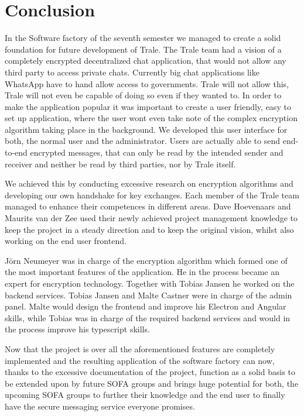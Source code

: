 \chapter{Conclusion}

In the Software factory of the seventh semester we managed to create a solid foundation for future development of Trale. 
The Trale team had a vision of a completely encrypted decentralized chat application, that would not allow any third party to access private chats. Currently big chat applications like WhatsApp have to hand allow access to governments. Trale will not allow this, Trale will not even be capable of doing so even if they wanted to. In order to make the application popular it was important to create a user friendly, easy to set up application, where the user wont even take note of the complex encryption algorithm taking place in the background. 
We developed this user interface for both, the normal user and the administrator. Users are actually able to send end-to-end encrypted messages, that can only be read by the intended sender and receiver and neither be read by third parties, nor by Trale itself. 

We achieved this by conducting excessive research on encryption algorithms and developing our own handshake for key exchanges. Each member of the Trale team managed to enhance their competences in different areas. Dave Hoevenaars and Maurits van der Zee used their newly achieved project management knowledge to keep the project in a steady direction and to keep the original vision, whilst also working on the end user frontend.
 
Jörn Neumeyer was in charge of the encryption algorithm which formed one of the most important features of the application. He in the process became an expert for encryption technology. Together with Tobias Jansen he worked on the backend services. Tobias Jansen and Malte Castner were in charge of the admin panel. Malte would design the frontend and improve his Electron and Angular skills, while Tobias was in charge of the required backend services and would in the process improve his typescript skills. 

Now that the project is over all the aforementioned features are completely implemented and the resulting application of the software factory can now, thanks to the excessive documentation of the project, function as a solid basis to be extended upon by future SOFA groups and brings huge potential for both, the upcoming SOFA groups to further their knowledge and the end user to finally have the secure messaging service everyone promises. 


